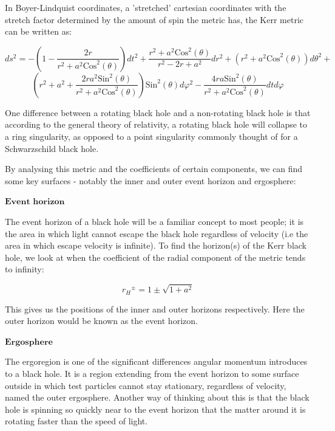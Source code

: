 \documentclass[landscape,a2paper,fontscale=1]{baposter} %
\begin{document}
\begin{poster}
{\begin{multicols}{2}
\vspace{1em}
In Boyer-Lindquist coordinates, a 'stretched' cartesian coordinates with the stretch factor determined by the amount of spin the metric has, the Kerr metric can be written as:

\begin{equation}
ds^{2} = -\left(1-\frac{2r}{r^2+a^2\mbox{Cos}^2(\theta)}\right) dt^2+\frac{r^2+a^2\mbox{Cos}^2(\theta)}{r^2-2r+a^2}dr^2+(r^2+a^2\mbox{Cos}^2(\theta))d\theta^2+
\end{equation}
\[ \left(r^2+a^2+\frac{2ra^2\mbox{Sin}^2(\theta)}{r^2+a^2\mbox{Cos}^2(\theta)}\right) \mbox{Sin}^2(\theta)d\varphi^2-\frac{4ra\mbox{Sin}^2(\theta)}{r^2+a^2\mbox{Cos}^2(\theta)}dtd\varphi \]

\vspace{1em}

One difference between a rotating black hole and a non-rotating black hole is that according to the general theory of relativity, a rotating black hole will collapse to a ring singularity, as opposed to a point singularity commonly thought of for a Schwarzschild black hole.

\vspace{1em}
By analysing this metric and the coefficients of certain components, we can find some key surfaces - notably the inner and outer event horizon and ergosphere:

\vspace{1em}
$\textbf{Event horizon}$

The event horizon of a black hole will be a familiar concept to most people; it is the area in which light cannot escape the black hole regardless of velocity (i.e the area in which escape velocity is infinite). To find the horizon(s) of the Kerr black hole, we look at when the coefficient of the radial component of the metric tends to infinity:

\begin{equation}
{r_{H}}^{\pm} = 1\pm\sqrt{1+a^2}
\end{equation}

\vspace{1em}
This gives us the positions of the inner and outer horizons respectively. Here the outer horizon would be known as the event horizon.
\vspace{2em}




$\textbf{Ergosphere}$

The ergoregion is one of the significant differences angular momentum introduces to a black hole. It is a region extending from the event horizon to some surface outside in which test particles cannot stay stationary, regardless of velocity, named the outer ergosphere. Another way of thinking about this is that the black hole is spinning so quickly near to the event horizon that the matter around it is rotating faster than the speed of light.


\end{multicols}}
\end{poster}
\end{document}
